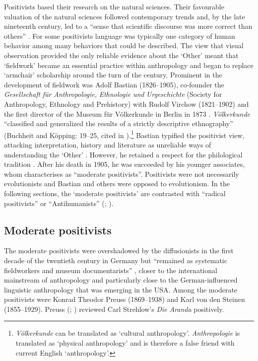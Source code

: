 \documentclass[output=paper]{langsci/langscibook}
\begin{document}
Positivists based their research on the natural sciences. Their favourable valuation of the natural sciences followed contemporary trends and, by the late nineteenth century, led to a ``sense that scientific discourse was more correct than others'' \citep[154]{crick_explorations_1976}. For some positivists language was typically one category of human behavior among many behaviors that could be described. The view that visual observation provided the only reliable evidence about the ‘Other’ meant that ‘fieldwork’ became an essential practice within anthropology and began to replace ‘armchair’ scholarship around the turn of the century. Prominent in the development of fieldwork was Adolf Bastian (1826--1905), co-founder the \textit{Gesellschaft} \textit{für} \textit{Anthropologie,} \textit{Ethnologie} \textit{und} \textit{Urgeschichte} (Society for Anthropology, Ethnology and Prehistory) with Rudolf Virchow (1821--1902) and the first director of the Museum für Völkerkunde in Berlin in 1873 \citep{kopping_adolf_1983}. \textit{Völkerkunde} ``classified and generalized the results of a strictly descriptive ethnography'' (Buchheit and Köpping: 19--25, cited in \citealt[87]{barth_german-speaking_2005}).\footnote{\textit{Völkerkunde} can be translated as `cultural anthropology'. \textit{Anthropologie} is translated as `physical anthropology' \citep[82]{stocking_virchow_1996} and is therefore a false friend with current English `anthropology'.} Bastian typified the positivist view, attacking interpretation, history and literature as unreliable ways of understanding the ‘Other’ \citep[61]{zimmerman_anthropology_2001}. However, he retained a respect for the philological tradition \citep[89]{barth_german-speaking_2005}.  After his death in 1905, he was succeeded by his younger associates, whom \citet[91]{barth_german-speaking_2005} characterises as ``moderate positivists''. Positivists were not necessarily evolutionists and Bastian and others were opposed to evolutionism. In the following sections, the ‘moderate positivists’ \citep[99]{barth_german-speaking_2005} are contrasted with ``radical positivists'' or ``Antihumanists'' (\citealt{zimmerman_anthropology_2001}; \citealt{monteath_globalising_2013}). 

\subsection{Moderate positivists}

The moderate positivists were overshadowed by the diffusionists in the first decade of the twentieth century in Germany but “remained as systematic fieldworkers and museum documentarists” \citep[92]{barth_german-speaking_2005}, closer to the international mainstream of anthropology and particularly close to the German-influenced linguistic anthropology that was emerging in the USA. Among the moderate positivists were Konrad Theodor Preuss (1869--1938) and Karl von den Steinen (1855--1929). Preuss (\citeyear{preuss_review_1908}; \citeyear{preuss_geographie_1909}) reviewed Carl Strehlow’s \textit{Die} \textit{Aranda} positively. 
\end{document}
